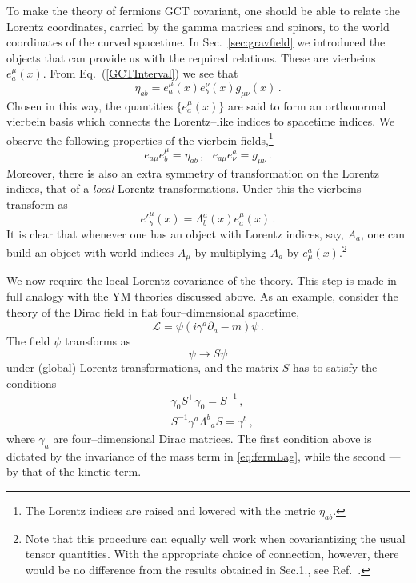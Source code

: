 \documentclass[11pt,a4paper]{article}
\newcommand{\be}{\begin{equation}}
\newcommand{\ee}{\end{equation}}
\newcommand\m{\mu}
\newcommand\g{\gamma}
\def\d{\partial}
\begin{document}
To make the theory of fermions GCT covariant, one should be able to relate the Lorentz coordinates, carried by the gamma matrices and spinors, to the world coordinates of the curved spacetime.
In Sec.~\ref{sec:gravfield} we introduced the objects that can provide us with the required relations.
These are vierbeins $e^\mu_a(x)$.
From Eq.~(\ref{GCTInterval}) we see that
\begin{equation}
\eta_{ab}=e^\mu_a(x)e^\nu_b(x)g_{\mu\nu}(x) \,.
\end{equation}
Chosen in this way, the quantities $\lbrace e^\mu_a(x)\rbrace $ are said to form an orthonormal vierbein basis which connects the Lorentz--like indices to spacetime indices. We observe the following properties of the vierbein fields,\footnote{The Lorentz indices are raised and lowered with the metric $\eta_{ab}$.}
\begin{equation}
e_{a \mu} e^{\mu}_b=\eta_{ab} \,,~~~ e_{a \mu} e^{a}_\nu=g_{\mu \nu} \,.
\end{equation}
Moreover, there is also an extra symmetry of transformation on the Lorentz indices, that of a {\em local} Lorentz transformations.
Under this the vierbeins transform as
\begin{equation}
e'^\mu_b(x)=\Lambda^a_{b}(x) e^\m_a(x)\,.
\end{equation}
It is clear that whenever one has an object with Lorentz indices, say, $A_a$, one can build an object with world indices $A_\mu$ by multiplying $A_a$ by $e^a_\mu(x)$.\footnote{Note that this procedure can equally well work when covariantizing the usual tensor quantities. With the appropriate choice of connection, however, there would be no difference from the results obtained in Sec.1., see Ref.~\cite{Ortin:2004ms}.}

We now require the local Lorentz covariance of the theory. This step is made in full analogy with the YM theories discussed above. As an example, consider the theory of the Dirac field in flat four--dimensional spacetime,
\be
\label{eq:fermLag}
 \mathcal{L}=\bar \psi (i\gamma^a \d_a -m)\psi \,.
\ee
The field $\psi$ transforms as
\be
\psi\to S\psi
\ee
under (global) Lorentz transformations, and the matrix $S$ has to satisfy the conditions
\be
\label{eq:invS}
\begin{split}
&\g_0S^+\g_0=S^{-1}\,,\\
&S^{-1}\g^a \Lambda^b_{\phantom{a}a} S=\g^b \,,
\end{split}
\ee
where $\g_a$ are four--dimensional Dirac matrices. The first condition above is dictated by the invariance of the mass term in \eqref{eq:fermLag}, while the second --- by that of the kinetic term.
\end{document}
